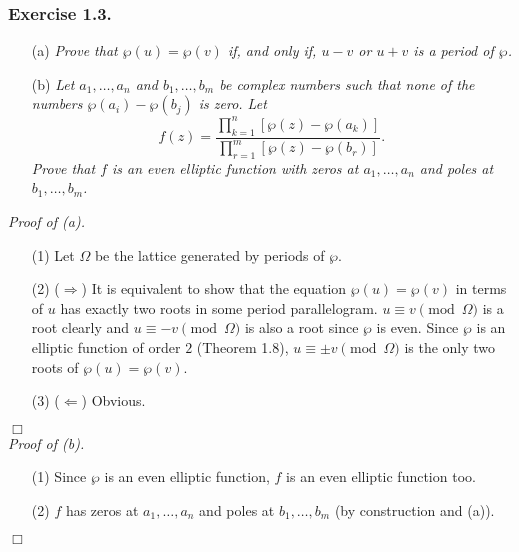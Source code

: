 \documentclass{article}
\begin{document}



\subsubsection*{Exercise 1.3.}
\begin{enumerate}
\item[(a)]
  \emph{Prove that $\wp(u) = \wp(v)$ if, and only if, $u-v$ or $u+v$ is a period of $\wp$.}

\item[(b)]
  \emph{Let $a_1, \ldots, a_n$ and $b_1, \ldots, b_m$ be complex numbers
  such that none of the numbers $\wp(a_i) - \wp(b_j)$ is zero.
  Let
  \[
    f(z) = \frac{\prod_{k=1}^{n}[\wp(z)-\wp(a_k)]}{\prod_{r=1}^{m}[\wp(z)-\wp(b_r)]}.
  \]
  Prove that $f$ is an even elliptic function with zeros at $a_1, \ldots, a_n$ and
  poles at $b_1, \ldots, b_m$.} \\
\end{enumerate}



\emph{Proof of (a).}
\begin{enumerate}
\item[(1)]
  Let $\Omega$ be the lattice generated by periods of $\wp$.

\item[(2)]
  ($\Longrightarrow$)
  It is equivalent to show that the equation $\wp(u) = \wp(v)$ in terms of $u$
  has exactly two roots in some period parallelogram.
  $u \equiv v \pmod{\Omega}$ is a root clearly and
  $u \equiv -v \pmod{\Omega}$ is also a root since $\wp$ is even.
  Since $\wp$ is an elliptic function of order $2$ (Theorem 1.8),
  $u \equiv \pm v \pmod{\Omega}$ is the only two roots of $\wp(u) = \wp(v)$.

\item[(3)]
  ($\Longleftarrow$)
  Obvious.
\end{enumerate}
$\Box$ \\



\emph{Proof of (b).}
\begin{enumerate}
\item[(1)]
  Since $\wp$ is an even elliptic function, $f$ is an even elliptic function too.

\item[(2)]
  $f$ has zeros at $a_1, \ldots, a_n$ and poles at $b_1, \ldots, b_m$
  (by construction and (a)).
\end{enumerate}
$\Box$ \\\\
\end{document}
